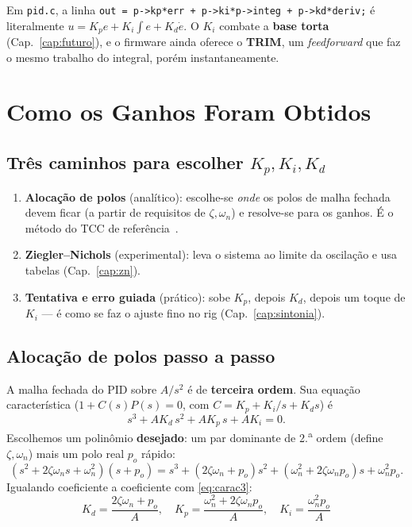 \begin{projeto}
Em \texttt{pid.c}, a linha \texttt{out = p->kp*err + p->ki*p->integ + p->kd*deriv;}
\'e literalmente $u=K_p e+K_i\!\int e+K_d\dot e$. O $K_i$ combate a
\textbf{base torta} (Cap.~\ref{cap:futuro}), e o firmware ainda oferece o \textbf{TRIM}, um
\emph{feedforward} que faz o mesmo trabalho do integral, por\'em instantaneamente.
\end{projeto}

\chapter{Como os Ganhos Foram Obtidos}\label{cap:ganhos}

\section{Tr\^es caminhos para escolher $K_p,K_i,K_d$}
\begin{enumerate}[leftmargin=1.5em]
  \item \textbf{Aloca\c{c}\~ao de polos} (anal\'itico): escolhe-se \emph{onde} os
  polos de malha fechada devem ficar (a partir de requisitos de $\zeta,\omega_n$) e
  resolve-se para os ganhos. \'E o m\'etodo do TCC de refer\^encia~\cite{cordeiro}.
  \item \textbf{Ziegler--Nichols} (experimental): leva o sistema ao limite da
  oscila\c{c}\~ao e usa tabelas (Cap.~\ref{cap:zn}).
  \item \textbf{Tentativa e erro guiada} (pr\'atico): sobe $K_p$, depois $K_d$,
  depois um toque de $K_i$ --- \'e como se faz o ajuste fino no rig (Cap.~\ref{cap:sintonia}).
\end{enumerate}

\section{Aloca\c{c}\~ao de polos passo a passo}
A malha fechada do PID sobre $A/s^2$ \'e de \textbf{terceira ordem}. Sua
equa\c{c}\~ao caracter\'istica ($1+C(s)P(s)=0$, com $C=K_p+K_i/s+K_d s$) \'e
\begin{equation}
s^3 + A K_d\,s^2 + A K_p\,s + A K_i = 0.
\label{eq:carac3}
\end{equation}
Escolhemos um polin\^omio \textbf{desejado}: um par dominante de 2.\textsuperscript{a}
ordem (define $\zeta,\omega_n$) mais um polo real $p_o$ r\'apido:
\begin{equation}
(s^2 + 2\zeta\omega_n s + \omega_n^2)(s+p_o)
= s^3 + (2\zeta\omega_n+p_o)s^2 + (\omega_n^2+2\zeta\omega_n p_o)s + \omega_n^2 p_o.
\end{equation}
Igualando coeficiente a coeficiente com \eqref{eq:carac3}:
\begin{equation}
\boxed{\;K_d=\dfrac{2\zeta\omega_n+p_o}{A},\quad
        K_p=\dfrac{\omega_n^2+2\zeta\omega_n p_o}{A},\quad
        K_i=\dfrac{\omega_n^2 p_o}{A}\;}
\label{eq:ganhos}
\end{equation}

